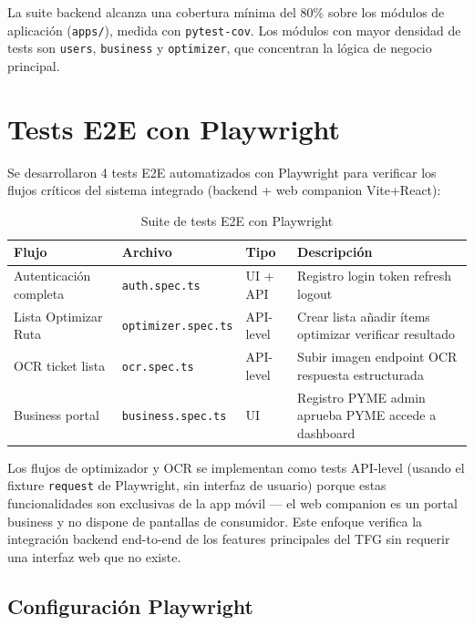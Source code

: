 La suite backend alcanza una cobertura m\'inima del 80\% sobre los m\'odulos de aplicaci\'on
(\texttt{apps/}), medida con \texttt{pytest-cov}. Los m\'odulos con mayor densidad de tests son
\texttt{users}, \texttt{business} y \texttt{optimizer}, que concentran la l\'ogica de negocio
principal.

\section{Tests E2E con Playwright}\label{sec:playwright}

Se desarrollaron 4 tests E2E automatizados con Playwright para verificar los flujos cr\'iticos del
sistema integrado (backend + web companion Vite+React):

\begin{table}[h]
\caption{Suite de tests E2E con Playwright}
\label{tab:tests-e2e}
\centering
\begin{tabular}{|l|l|l|p{5cm}|}
\hline
\textbf{Flujo} & \textbf{Archivo} & \textbf{Tipo} & \textbf{Descripci\'on} \\
\hline
Autenticaci\'on completa & \texttt{auth.spec.ts} & UI + API &
  Registro \textrightarrow{} login \textrightarrow{} token refresh \textrightarrow{} logout \\
Lista \textrightarrow{} Optimizar \textrightarrow{} Ruta & \texttt{optimizer.spec.ts} & API-level &
  Crear lista \textrightarrow{} a\~nadir \'items \textrightarrow{} optimizar \textrightarrow{}
  verificar resultado \\
OCR ticket \textrightarrow{} lista & \texttt{ocr.spec.ts} & API-level &
  Subir imagen \textrightarrow{} endpoint OCR \textrightarrow{} respuesta estructurada \\
Business portal & \texttt{business.spec.ts} & UI &
  Registro PYME \textrightarrow{} admin aprueba \textrightarrow{} PYME accede a dashboard \\
\hline
\end{tabular}
\end{table}

Los flujos de optimizador y OCR se implementan como tests API-level (usando el fixture
\texttt{request} de Playwright, sin interfaz de usuario) porque estas funcionalidades son exclusivas
de la app m\'ovil --- el web companion es un portal business y no dispone de pantallas de
consumidor. Este enfoque verifica la integraci\'on backend end-to-end de los features principales
del TFG sin requerir una interfaz web que no existe.

\subsection{Configuraci\'on Playwright}\label{subsec:playwright-config}

